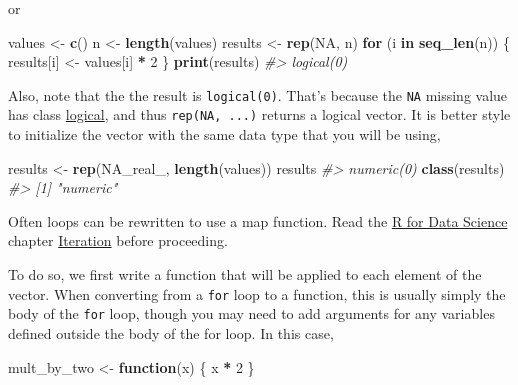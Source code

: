 \documentclass[]{book}
\newenvironment{Shaded}{\begin{snugshade}}{\end{snugshade}}
\newcommand{\KeywordTok}[1]{\textcolor[rgb]{0.13,0.29,0.53}{\textbf{#1}}}
\newcommand{\DecValTok}[1]{\textcolor[rgb]{0.00,0.00,0.81}{#1}}
\newcommand{\StringTok}[1]{\textcolor[rgb]{0.31,0.60,0.02}{#1}}
\newcommand{\CommentTok}[1]{\textcolor[rgb]{0.56,0.35,0.01}{\textit{#1}}}
\newcommand{\OtherTok}[1]{\textcolor[rgb]{0.56,0.35,0.01}{#1}}
\newcommand{\ControlFlowTok}[1]{\textcolor[rgb]{0.13,0.29,0.53}{\textbf{#1}}}
\newcommand{\OperatorTok}[1]{\textcolor[rgb]{0.81,0.36,0.00}{\textbf{#1}}}
\newcommand{\NormalTok}[1]{#1}
\theoremstyle{definition}
\theoremstyle{definition}
\theoremstyle{definition}
\theoremstyle{remark}
\begin{document}
or

\begin{Shaded}
\begin{Highlighting}[]
\NormalTok{values <-}\StringTok{ }\KeywordTok{c}\NormalTok{()}
\NormalTok{n <-}\StringTok{ }\KeywordTok{length}\NormalTok{(values)}
\NormalTok{results <-}\StringTok{ }\KeywordTok{rep}\NormalTok{(}\OtherTok{NA}\NormalTok{, n)}
\ControlFlowTok{for}\NormalTok{ (i }\ControlFlowTok{in} \KeywordTok{seq_len}\NormalTok{(n)) \{}
\NormalTok{  results[i] <-}\StringTok{ }\NormalTok{values[i] }\OperatorTok{*}\StringTok{ }\DecValTok{2}
\NormalTok{\}}
\KeywordTok{print}\NormalTok{(results)}
\CommentTok{#> logical(0)}
\end{Highlighting}
\end{Shaded}

Also, note that the the result is \texttt{logical(0)}. That's because
the \texttt{NA} missing value has class
\href{http://r4ds.had.co.nz/vectors.html\#missing-values-4}{logical},
and thus \texttt{rep(NA,\ ...)} returns a logical vector. It is better
style to initialize the vector with the same data type that you will be
using,

\begin{Shaded}
\begin{Highlighting}[]
\NormalTok{results <-}\StringTok{ }\KeywordTok{rep}\NormalTok{(}\OtherTok{NA_real_}\NormalTok{, }\KeywordTok{length}\NormalTok{(values))}
\NormalTok{results}
\CommentTok{#> numeric(0)}
\KeywordTok{class}\NormalTok{(results)}
\CommentTok{#> [1] "numeric"}
\end{Highlighting}
\end{Shaded}

Often loops can be rewritten to use a map function. Read the
\href{http://r4ds.had.co.nz/}{R for Data Science} chapter
\href{http://r4ds.had.co.nz/data-visualisation.html}{Iteration} before
proceeding.

To do so, we first write a function that will be applied to each element
of the vector. When converting from a \texttt{for} loop to a function,
this is usually simply the body of the \texttt{for} loop, though you may
need to add arguments for any variables defined outside the body of the
for loop. In this case,

\begin{Shaded}
\begin{Highlighting}[]
\NormalTok{mult_by_two <-}\StringTok{ }\ControlFlowTok{function}\NormalTok{(x) \{}
\NormalTok{  x }\OperatorTok{*}\StringTok{ }\DecValTok{2}
\NormalTok{\}}
\end{Highlighting}
\end{Shaded}
\end{document}
